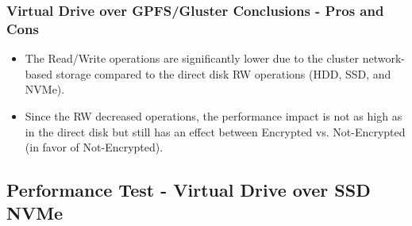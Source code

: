 \subsubsection{Virtual Drive over GPFS/Gluster Conclusions - Pros and Cons}
\begin{itemize}
  \item The Read/Write operations are significantly lower due to the cluster network-based storage compared to the direct disk RW operations (HDD, SSD, and NVMe).
  \item Since the RW decreased operations, the performance impact is not as high as in the direct disk but still has an effect between Encrypted vs. Not-Encrypted (in favor of Not-Encrypted).
\end{itemize}

\newpage
\subsection{Performance Test - Virtual Drive over SSD NVMe}
